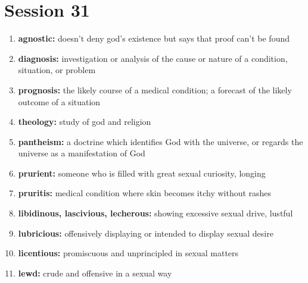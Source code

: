 \documentclass{article}
\begin{document}
\section{Session 31}
\begin{enumerate}
    \item \textbf{agnostic: }{doesn't deny god's existence but says that proof can't be found}
    \item \textbf{diagnosis: }{investigation or analysis of the cause or nature of a condition, situation, or problem}
    \item \textbf{prognosis: }{the likely course of a medical condition; a forecast of the likely outcome of a situation}
    \item \textbf{theology: }{study of god and religion}
    \item \textbf{pantheism: }{a doctrine which identifies God with the universe, or regards the universe as a manifestation of God}
    \item \textbf{prurient: }{someone who is filled with great sexual curiosity, longing}
    \item \textbf{pruritis: }{medical condition where skin becomes itchy without rashes}
    \item \textbf{libidinous, lascivious, lecherous: }{showing excessive sexual drive, lustful}
    \item \textbf{lubricious: }{offensively displaying or intended to display sexual desire}
    \item \textbf{licentious: }{promiscuous and unprincipled in sexual matters}
    \item \textbf{lewd: }{crude and offensive in a sexual way}
    
\end{enumerate}
\end{document}
